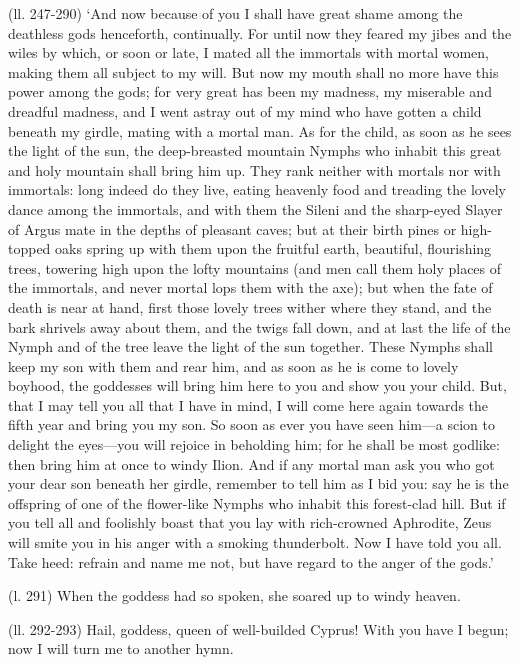 (ll. 247-290) ‘And now because of you I shall have great shame among the
deathless gods henceforth, continually. For until now they feared my jibes and
the wiles by which, or soon or late, I mated all the immortals with mortal
women, making them all subject to my will. But now my mouth shall no more have
this power among the gods; for very great has been my madness, my miserable and
dreadful madness, and I went astray out of my mind who have gotten a child
beneath my girdle, mating with a mortal man. As for the child, as soon as he
sees the light of the sun, the deep-breasted mountain Nymphs who inhabit this
great and holy mountain shall bring him up. They rank neither with mortals nor
with immortals: long indeed do they live, eating heavenly food and treading the
lovely dance among the immortals, and with them the Sileni and the sharp-eyed
Slayer of Argus mate in the depths of pleasant caves; but at their birth pines
or high-topped oaks spring up with them upon the fruitful earth, beautiful,
flourishing trees, towering high upon the lofty mountains (and men call them
holy places of the immortals, and never mortal lops them with the axe); but
when the fate of death is near at hand, first those lovely trees wither where
they stand, and the bark shrivels away about them, and the twigs fall down, and
at last the life of the Nymph and of the tree leave the light of the sun
together. These Nymphs shall keep my son with them and rear him, and as soon as
he is come to lovely boyhood, the goddesses will bring him here to you and show
you your child. But, that I may tell you all that I have in mind, I will come
here again towards the fifth year and bring you my son. So soon as ever you
have seen him—a scion to delight the eyes—you will rejoice in
beholding him; for he shall be most godlike: then bring him at once to windy
Ilion. And if any mortal man ask you who got your dear son beneath her girdle,
remember to tell him as I bid you: say he is the offspring of one of the
flower-like Nymphs who inhabit this forest-clad hill. But if you tell all and
foolishly boast that you lay with rich-crowned Aphrodite, Zeus will smite you
in his anger with a smoking thunderbolt. Now I have told you all. Take heed:
refrain and name me not, but have regard to the anger of the gods.’

(l. 291) When the goddess had so spoken, she soared up to windy heaven.

(ll. 292-293) Hail, goddess, queen of well-builded Cyprus! With you have I
begun; now I will turn me to another hymn.

